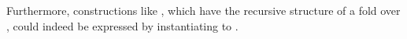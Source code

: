 Furthermore, constructions like , which have the recursive structure of a fold over , could indeed be expressed by instantiating  to .









